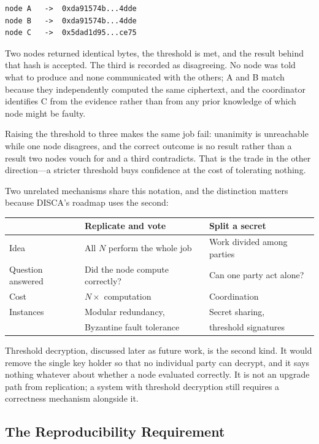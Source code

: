 \documentclass[12pt,a4paper]{article}
\begin{document}
\begin{verbatim}
node A   ->  0xda91574b...4dde
node B   ->  0xda91574b...4dde
node C   ->  0x5dad1d95...ce75
\end{verbatim}

Two nodes returned identical bytes, the threshold is met, and the result behind that hash is accepted.
The third is recorded as disagreeing.
No node was told what to produce and none communicated with the others; A and B match because they independently computed the same ciphertext, and the coordinator identifies C from the evidence rather than from any prior knowledge of which node might be faulty.

Raising the threshold to three makes the same job fail: unanimity is unreachable while one node disagrees, and the correct outcome is no result rather than a result two nodes vouch for and a third contradicts.
That is the trade in the other direction---a stricter threshold buys confidence at the cost of tolerating nothing.

Two unrelated mechanisms share this notation, and the distinction matters because DISCA's roadmap uses the second:

\begin{center}
\begin{tabular}{lll}
\hline
 & Replicate and vote & Split a secret \\
\hline
Idea & All $N$ perform the whole job & Work divided among parties \\
Question answered & Did the node compute correctly? & Can one party act alone? \\
Cost & $N \times$ computation & Coordination \\
Instances & Modular redundancy, & Secret sharing, \\
 & Byzantine fault tolerance~\cite{byzantine_generals} & threshold signatures~\cite{shamir_secret_sharing} \\
\hline
\end{tabular}
\end{center}

Threshold decryption, discussed later as future work, is the second kind.
It would remove the single key holder so that no individual party can decrypt, and it says nothing whatever about whether a node evaluated correctly.
It is not an upgrade path from replication; a system with threshold decryption still requires a correctness mechanism alongside it.

\subsection{The Reproducibility Requirement}
\end{document}
